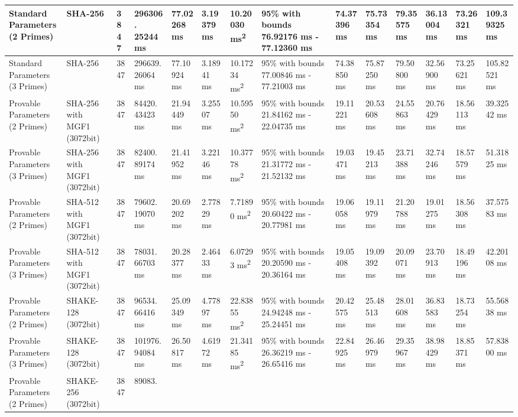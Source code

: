 \documentclass[]{final_report}
\theoremstyle{definition}
\begin{document}
\begin{landscape}
\begin{longtable}{|p{2.3cm}|p{1.8cm}|p{1.0cm}|p{1.7cm}|p{1.4cm}|p{1.5cm}|p{1.8cm}|p{1.5cm}|p{1.43cm}|p{1.5cm}|p{1.3cm}|p{1.4cm}|p{1.3cm}|p{1.37cm}|}
Standard Parameters (2 Primes) & SHA-256 & 3847 & 296306.
25244 ms & 77.02268 ms & 3.19379 ms & 10.20030 ms\textsuperscript{2} & 95\% with bounds 76.92176 ms - 77.12360 ms & 74.37396 ms & 75.73354 ms & 79.35575 ms & 36.13004 ms & 73.26321 ms & 109.39325 ms \\
\hline
Standard Parameters (3 Primes) & SHA-256 & 3847 & 296639.
26064 ms & 77.10924 ms & 3.18941 ms & 10.17234 ms\textsuperscript{2} & 95\% with bounds 77.00846 ms - 77.21003 ms & 74.38850 ms & 75.87250 ms & 79.50800 ms & 32.56900 ms & 73.25621 ms & 105.82521 ms \\
\hline
Provable Parameters (2 Primes) & SHA-256 with MGF1 (3072bit) & 3847 & 84420.
43423 ms & 21.94449 ms & 3.25507 ms & 10.59550 ms\textsuperscript{2} & 95\% with bounds 21.84162 ms - 22.04735 ms & 19.11221 ms & 20.53608 ms & 24.55863 ms & 20.76429 ms & 18.56113 ms & 39.32542 ms \\
\hline
Provable Parameters (3 Primes) & SHA-256 with MGF1 (3072bit) & 3847 & 82400.
89174 ms & 21.41952 ms & 3.22146 ms & 10.37778 ms\textsuperscript{2} & 95\% with bounds 21.31772 ms - 21.52132 ms & 19.03471 ms & 19.45213 ms & 23.71388 ms & 32.74246 ms & 18.57579 ms & 51.31825 ms \\
\hline
Provable Parameters (2 Primes) & SHA-512 with MGF1 (3072bit) & 3847 & 79602.
19070 ms & 20.69202 ms & 2.77829 ms & 7.71890 ms\textsuperscript{2} & 95\% with bounds 20.60422 ms - 20.77981 ms & 19.06058 ms & 19.11979 ms & 21.20788 ms & 19.01275 ms & 18.56308 ms & 37.57583 ms \\
\hline
Provable Parameters (3 Primes) & SHA-512 with MGF1 (3072bit) & 3847 & 78031.
66703 ms & 20.28377 ms & 2.46433 ms & 6.07293 ms\textsuperscript{2} & 95\% with bounds 20.20590 ms - 20.36164 ms & 19.05408 ms & 19.09392 ms & 20.09071 ms & 23.70913 ms & 18.49196 ms & 42.20108 ms \\
\hline
Provable Parameters (2 Primes) & SHAKE-128 (3072bit) & 3847 & 96534.
66416 ms & 25.09349 ms & 4.77897 ms & 22.83855 ms\textsuperscript{2} & 95\% with bounds 24.94248 ms - 25.24451 ms & 20.42575 ms & 25.48513 ms & 28.01608 ms & 36.83583 ms & 18.73254 ms & 55.56838 ms \\
\hline
Provable Parameters (3 Primes) & SHAKE-128 (3072bit) & 3847 & 101976.
94084 ms & 26.50817 ms & 4.61972 ms & 21.34185 ms\textsuperscript{2} & 95\% with bounds 26.36219 ms - 26.65416 ms & 22.84925 ms & 26.46979 ms & 29.35967 ms & 38.98429 ms & 18.85371 ms & 57.83800 ms \\
\hline
Provable Parameters (2 Primes) & SHAKE-256 (3072bit) & 3847 & 89083.

\end{longtable}
\end{landscape}
\end{document}
